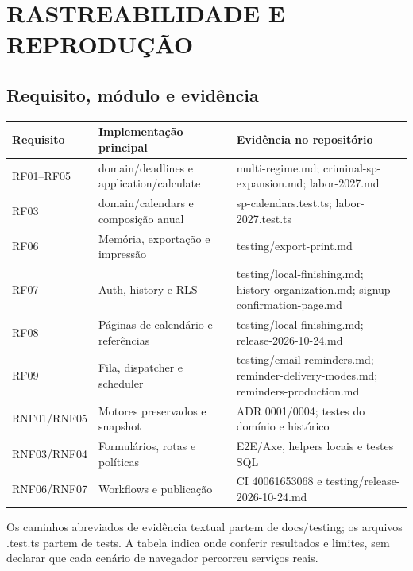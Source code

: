 \chapter{RASTREABILIDADE E REPRODUÇÃO}
\label{chapter-D}
\section{Requisito, módulo e evidência}
\label{section-D-1}
\begin{quadro}[H]\centering
\caption{Rastreabilidade resumida}
\label{quadro-8}
\begin{singlespace}\fontsize{10}{12}\selectfont
\begin{tabularx}{\linewidth}{|>{\raggedright\arraybackslash}X|>{\raggedright\arraybackslash}X|>{\raggedright\arraybackslash}X|}
\hline
\textbf{Requisito} & \textbf{Implementação principal} & \textbf{Evidência no repositório} \\
\hline
RF01--RF05 & domain/deadlines e application/calculate & multi-regime.md; criminal-sp-expansion.md; labor-2027.md \\
\hline
RF03 & domain/calendars e composição anual & sp-calendars.test.ts; labor-2027.test.ts \\
\hline
RF06 & Memória, exportação e impressão & testing/export-print.md \\
\hline
RF07 & Auth, history e RLS & testing/local-finishing.md; history-organization.md; signup-confirmation-page.md \\
\hline
RF08 & Páginas de calendário e referências & testing/local-finishing.md; release-2026-10-24.md \\
\hline
RF09 & Fila, dispatcher e scheduler & testing/email-reminders.md; reminder-delivery-modes.md; reminders-production.md \\
\hline
RNF01/RNF05 & Motores preservados e snapshot & ADR 0001/0004; testes do domínio e histórico \\
\hline
RNF03/RNF04 & Formulários, rotas e políticas & E2E/Axe, helpers locais e testes SQL \\
\hline
RNF06/RNF07 & Workflows e publicação & CI 40061653068 e testing/release-2026-10-24.md \\
\hline
\end{tabularx}\end{singlespace}
\par{}
\end{quadro}
Os caminhos abreviados de evidência textual partem de docs/testing; os arquivos .test.ts partem de tests. A tabela indica onde conferir resultados e limites, sem declarar que cada cenário de navegador percorreu serviços reais.


